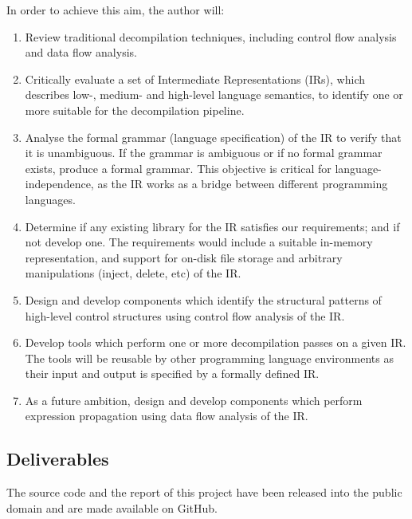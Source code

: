 In order to achieve this aim, the author will:
\begin{enumerate}
	\item Review traditional decompilation techniques, including control flow analysis and data flow analysis.
	\label{itm:obj_review_decomp}
	\item Critically evaluate a set of Intermediate Representations (IRs), which describes low-, medium- and high-level language semantics, to identify one or more suitable for the decompilation pipeline.
	\label{itm:obj_review_suitable_ir}
	\item Analyse the formal grammar (language specification) of the IR to verify that it is unambiguous. If the grammar is ambiguous or if no formal grammar exists, produce a formal grammar. This objective is critical for language-independence, as the IR works as a bridge between different programming languages.
	\label{itm:obj_formal_ir}
	\item Determine if any existing library for the IR satisfies our requirements; and if not develop one. The requirements would include a suitable in-memory representation, and support for on-disk file storage and arbitrary manipulations (inject, delete, etc) of the IR.
	\label{itm:obj_ir_library}
	\item Design and develop components which identify the structural patterns of high-level control structures using control flow analysis of the IR.
	\label{itm:obj_structural_analysis_library}
	\item Develop tools which perform one or more decompilation passes on a given IR. The tools will be reusable by other programming language environments as their input and output is specified by a formally defined IR.
	\label{itm:obj_structural_analysis_tool}
	\item As a future ambition, design and develop components which perform expression propagation using data flow analysis of the IR.
	\label{itm:obj_data_analysis_library}
\end{enumerate}


\subsection{Deliverables}

The source code and the report of this project have been released into the public domain \cite{cc0} and are made available on GitHub.

